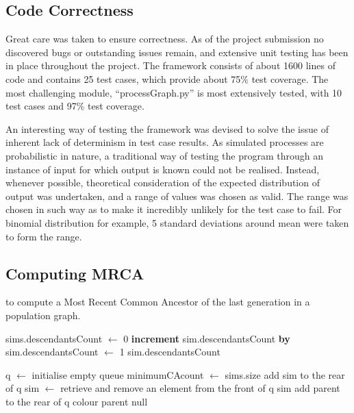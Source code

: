 \documentclass{l4proj}
\begin{document}
\subsection{Code Correctness}
Great care was taken to ensure correctness. As of the project submission no discovered bugs or outstanding issues remain, and extensive unit testing has been in place throughout the project. The framework consists of about 1600 lines of code and contains 25 test cases, which provide about 75\% test coverage. The most challenging module, ``processGraph.py'' is most extensively tested, with 10 test cases and 97\% test coverage.

An interesting way of testing the framework was devised to solve the issue of inherent lack of determinism in test case results. As simulated processes are probabilistic in nature, a traditional way of testing the program through an instance of input for which output is known could not be realised. Instead, whenever possible, theoretical consideration of the expected distribution of output was undertaken, and a range of values was chosen as valid. The range was chosen in such way as to make it incredibly unlikely for the test case to fail. For binomial distribution for example, 5 standard deviations around mean were taken to form the range.

\subsection{Computing MRCA}

\begin{algorithm}
\centering
\caption{to compute a Most Recent Common Ancestor of the last generation in a population graph.}
\label{MRCA1}
\begin{algorithmic}[1]
    \State {}
\EndFor
\State \Return {}
\EndProcedure

\State sims.descendantsCount $\gets$ 0
\Else {} 
\EndIf
{}
\State \textbf{increment} sim.descendantsCount \textbf{by} 
\EndFor
{}
\State sim.descendantsCount $\gets$ 1
\EndIf
\State\Return sim.descendantsCount
\EndProcedure

\State q $\gets$ initialise empty queue
\State minimumCAcount $\gets$ sims.size
\State add sim to the rear of q
\EndFor
{}
  \State sim $\gets$ retrieve and remove an element from the front of q
   \Return sim
  \EndIf
      \State add parent to the rear of q
      \State colour parent
    \EndIf
    \EndFor
\EndWhile
\State \Return null
\EndProcedure

\end{algorithmic}
\end{algorithm}
\end{document}
